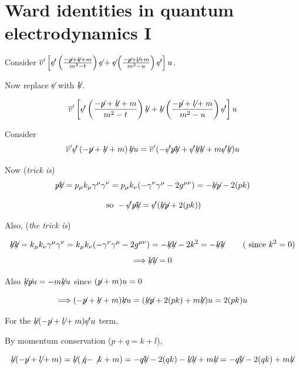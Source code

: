 \documentclass[twoside]{amsart}
\newcommand{\solutionhead}[1]
  {\smallskip
   \noindent{\large\bf Solution #1.}
   }
\begin{document}
\section{Ward identities in quantum electrodynamics I}




\solutionhead{67.2}

Consider $\overline{v}' \left[ {\not}{\epsilon}' \left( \frac{ - {\not}{p} + {\not}{k} + m }{ m^2  - t } \right)  {\not}{\epsilon } + {\not}{\epsilon }  \left(  \frac{ - {\not}{p } + {\not}{l } + m }{ m^2 - u } \right) {\not}{\epsilon}' \right] u$.  

Now replace ${\not}{\epsilon}$ with ${\not}{k}$.  

\[
\overline{v}' \left[ {\not}{\epsilon}' \left( \frac{ - {\not}{p} + {\not}{k} + m }{ m^2  - t } \right)  {\not}{k} + {\not}{k }  \left(  \frac{ - {\not}{p } + {\not}{l } + m }{ m^2 - u } \right) {\not}{\epsilon}' \right] u
\]

Consider
\[
  \overline{v}' {\not}{\epsilon}' \left(  - {\not}{p} + {\not}{k} + m  \right)  {\not}{k} u = \overline{v}' ( - {\not}{\epsilon}' {\not}{p} {\not}{k} + {\not}{\epsilon}' {\not}{k} {\not}{k} + m {\not}{\epsilon}' {\not}{k} ) u 
\]

Now (\emph{trick is})
\[
{\not}{p} {\not}{k} = p_{\mu} k_{\mu} \gamma^{\mu} \gamma^{\nu} = p_{\mu} k_{\nu} (- \gamma^{\nu} \gamma^{\mu} - 2 g^{\mu \nu} ) = - {\not}{k} {\not}{p} - 2(pk)
\]

\[
\text{ so } - {\not}{\epsilon}' {\not}{p} {\not}{k} = {\not}{\epsilon}' ( {\not}{k} {\not}{p} +  2(pk) )
\]

Also, (\emph{the trick is})

\[
{\not}{k}  {\not}{k} = k_{\mu} k_{\nu} \gamma^{\mu} \gamma^{\nu} = k_{\mu} k_{\nu} ( -\gamma^{\nu} \gamma^{\mu} - 2g^{\mu \nu } ) = - {\not}{k}  {\not}{k}  - 2k^2 = - {\not}{k}  {\not}{k}  \quad \quad \, (\text{ since } k^2 = 0)
\]
\[
\Longrightarrow {\not}{k}  {\not}{k}  = 0
\]

Also $ {\not}{k}  {\not}{p} u = - m {\not}{k} u$ since $({\not}{p} + m  ) u = 0$

\[
\Longrightarrow (- {\not}{p} + {\not}{k} + m ) {\not}{k} u = ( {\not}{k} {\not}{p} + 2(pk) + m {\not}{k} ) u = 2(pk) u 
\]

For the ${\not}{k}(- {\not}{p} + {\not}{l} + m ) {\not}{\epsilon}' u$ term, 

By momentum conservation ($p + q = k + l$), 

\[
{\not}{k} ( - {\not}{p}  + {\not}{l } + m ) = {\not}{k} ( \not{q} - \not{k} + m)  = - {\not}{q} {\not}{k} - 2(qk) - {\not}{k} {\not}{k} + m {\not}{k} = - {\not}{q} {\not}{k} - 2(qk) + m {\not}{k} 
\]
\end{document}

